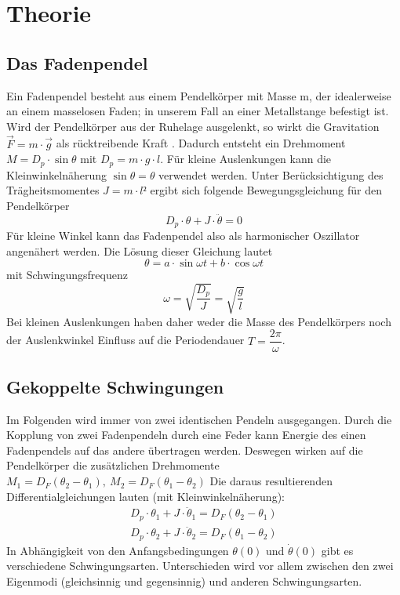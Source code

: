 \section{Theorie}
\label{sec:Theorie}
\subsection{Das Fadenpendel}
    Ein Fadenpendel besteht aus einem Pendelkörper mit Masse m, der idealerweise 
    an einem masselosen Faden; in unserem Fall an einer Metallstange befestigt ist.
    Wird der Pendelkörper aus der Ruhelage ausgelenkt, so wirkt die 
    Gravitation $\vec{F}=m\cdot \vec{g} $ als rücktreibende Kraft . Dadurch entsteht  
    ein Drehmoment $M= D_p \cdot \sin{\theta}$ mit $D_p= m\cdot g\cdot l$. Für kleine Auslenkungen 
    kann die Kleinwinkelnäherung $\sin{\theta}=\theta$ verwendet werden. %
    Unter Berücksichtigung des Trägheitsmomentes $J=m\cdot l²$ ergibt sich folgende Bewegungsgleichung 
    für den Pendelkörper
    \begin{equation}
        D_p \cdot \theta+J\cdot \ddot \theta=0
    \end{equation}
    Für kleine Winkel kann das Fadenpendel also als harmonischer Oszillator angenähert werden.
    Die Lösung dieser Gleichung lautet
    \begin{equation}
        \theta=a\cdot \sin{\omega t} + b\cdot \cos{\omega t}
    \end{equation}
    mit Schwingungsfrequenz
    \begin{equation}
        \omega= \sqrt{\dfrac{D_p}{J}}=\sqrt{\dfrac{g}{l}}
    \end{equation}
    Bei kleinen Auslenkungen haben daher weder die Masse des Pendelkörpers noch der
    Auslenkwinkel Einfluss auf die Periodendauer $T=\dfrac{2\pi}{\omega}$.

\subsection{Gekoppelte Schwingungen}
    Im Folgenden wird immer von zwei identischen Pendeln ausgegangen. Durch die 
    Kopplung von zwei Fadenpendeln durch eine Feder kann Energie des einen 
    Fadenpendels auf das andere übertragen werden. Deswegen wirken auf die Pendelkörper
    die zusätzlichen Drehmomente $M_1=D_F(\theta_2-\theta_1),\ M_2=D_F(\theta_1-\theta_2)$ 
    Die daraus resultierenden Differentialgleichungen lauten (mit Kleinwinkelnäherung):
    \begin{align}
         D_p \cdot \theta_1+J\cdot \ddot \theta_1=D_F(\theta_2-\theta_1)\\
         D_p \cdot \theta_2+J\cdot \ddot \theta_2=D_F(\theta_1-\theta_2)
    \end{align}
    In Abhängigkeit von den Anfangsbedingungen $\theta(0)$ und $\dot \theta(0)$ gibt es 
    verschiedene Schwingungsarten. Unterschieden wird vor allem zwischen den zwei Eigenmodi 
    (gleichsinnig und gegensinnig) und anderen Schwingungsarten. 

